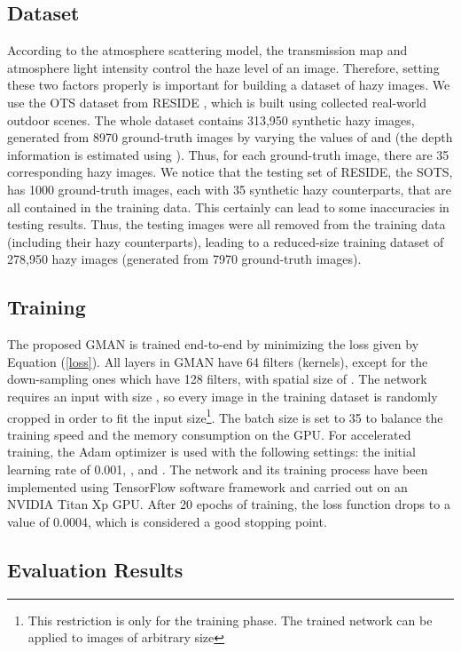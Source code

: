 \documentclass[journal]{IEEEtran}
\begin{document}
\subsection{Dataset}

According to the atmosphere scattering model, the transmission map  and atmosphere light intensity  control the haze level of an image. Therefore, setting these two factors properly is important for building a dataset of hazy images. We use the OTS dataset from RESIDE \cite{li2017reside}, which is built using collected real-world outdoor scenes. The whole dataset contains 313,950 synthetic hazy images, generated from 8970 ground-truth images by varying the values of  and  (the depth information is estimated using \cite{liu2016learning}).
Thus, for each ground-truth image, there are 35 corresponding hazy images. We notice that the testing set of RESIDE, the SOTS, has 1000 ground-truth images, each with 35 synthetic hazy counterparts, that are all contained in the training data. This certainly can lead to some inaccuracies in testing results. Thus, the testing images were all removed from the training data (including their hazy counterparts), leading to a reduced-size training dataset of 278,950 hazy images (generated from 7970 ground-truth images).

\subsection{Training}

The proposed GMAN is trained end-to-end by minimizing the loss  given by Equation (\ref{loss}). All layers in GMAN have 64 filters (kernels), except for the down-sampling ones which have 128 filters, with spatial size of . The network requires an input with size , so every image in the training dataset is randomly cropped in order to fit the input size\footnote{This restriction is only for the training phase. The trained network can be applied to images of arbitrary size}. The batch size is set to 35 to balance the training speed and the memory consumption on the GPU. For accelerated training, the Adam optimizer \cite{AdamOpt} is used with the following settings: the initial learning rate of 0.001, , and . The network and its training process have been implemented using TensorFlow software framework and carried out on an NVIDIA Titan Xp GPU. After 20 epochs of training, the loss function drops to a value of 0.0004, which is considered a good stopping point.

\subsection{Evaluation Results}
\end{document}
